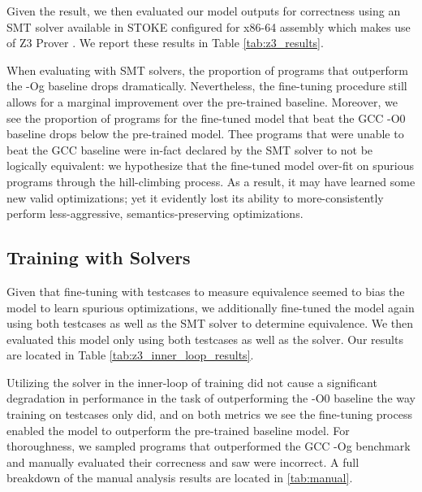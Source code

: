 \documentclass{article}
\begin{document}
Given the result, we then evaluated our model outputs for correctness using an SMT solver available in \textsc{STOKE} configured for x86-64 assembly which makes use of Z3 Prover \cite{de2008z3}. We report these results in Table \ref{tab:z3_results}. 


When evaluating with SMT solvers, the proportion of programs that outperform the -Og baseline drops dramatically. Nevertheless, the fine-tuning procedure still allows for a marginal improvement over the pre-trained baseline. Moreover, we see the proportion of programs for the fine-tuned model that beat the GCC -O0 baseline drops below the pre-trained model. Thee programs that were unable to beat the GCC baseline were in-fact declared by the SMT solver to not be logically equivalent: we hypothesize that the fine-tuned model over-fit on spurious programs through the hill-climbing process. As a result, it may have learned some new valid optimizations; yet it evidently lost its ability to more-consistently perform less-aggressive, semantics-preserving optimizations. 


\subsection{Training with Solvers}

Given that fine-tuning with testcases to measure equivalence seemed to bias the model to learn spurious optimizations, we additionally fine-tuned the model again using both testcases as well as the SMT solver to determine equivalence. We then evaluated this model only using both testcases as well as the solver. Our results are located in Table \ref{tab:z3_inner_loop_results}. 

Utilizing the solver in the inner-loop of training did not cause a significant degradation in performance in the task of outperforming the -O0 baseline the way training on testcases only did, and on both metrics we see the fine-tuning process enabled the model to outperform the pre-trained baseline model. For thoroughness, we sampled  programs that outperformed the GCC -Og benchmark and manually evaluated their correcness and saw  were incorrect. A full breakdown of the manual analysis results are located in \ref{tab:manual}.


\end{document}
